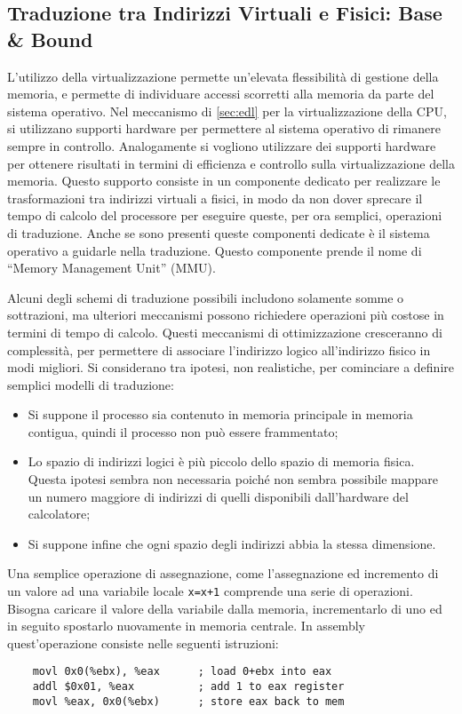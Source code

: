 \documentclass{article}
\numberwithin{equation}{subsection}
\begin{document}
\subsection{Traduzione tra Indirizzi Virtuali e Fisici: Base \& Bound}

L'utilizzo della virtualizzazione permette un'elevata flessibilità di gestione della memoria, e permette di individuare accessi scorretti alla memoria da parte del 
sistema operativo. Nel meccanismo di \ref{sec:edl} per la virtualizzazione della CPU, si utilizzano supporti hardware per permettere al sistema operativo di 
rimanere sempre in controllo. 
Analogamente si vogliono utilizzare dei supporti hardware per ottenere risultati in termini di efficienza e controllo sulla virtualizzazione della memoria. 
Questo supporto consiste in un componente dedicato per realizzare le trasformazioni tra indirizzi virtuali a fisici, in modo da non dover sprecare il tempo di calcolo 
del processore per eseguire queste, per ora semplici, operazioni di traduzione. Anche se sono presenti queste componenti dedicate è il sistema operativo a guidarle 
nella traduzione. Questo componente prende il nome di ``Memory Management Unit'' (MMU). 

Alcuni degli schemi di traduzione possibili includono solamente somme o sottrazioni, ma ulteriori meccanismi possono richiedere operazioni più costose in termini di 
tempo di calcolo. 
Questi meccanismi di ottimizzazione cresceranno di complessità, per permettere di associare l'indirizzo logico all'indirizzo fisico in modi migliori.  
Si considerano tra ipotesi, non realistiche, per cominciare a definire semplici modelli di traduzione:
\begin{itemize}
    \item Si suppone il processo sia contenuto in memoria principale in memoria contigua, quindi il processo non può essere frammentato; 
    \item Lo spazio di indirizzi logici è più piccolo dello spazio di memoria fisica. Questa ipotesi sembra non necessaria poiché non sembra possibile mappare un numero maggiore 
di indirizzi di quelli disponibili dall'hardware del calcolatore;
    \item Si suppone infine che ogni spazio degli indirizzi abbia la stessa dimensione.
\end{itemize} 

Una semplice operazione di assegnazione, come l'assegnazione ed incremento di un valore ad una variabile locale \verb|x=x+1| comprende una serie di operazioni. 
Bisogna caricare il valore della variabile dalla memoria, incrementarlo di uno ed in seguito spostarlo nuovamente in memoria centrale. In assembly quest'operazione 
consiste nelle seguenti istruzioni:
\begin{verbatim}
    movl 0x0(%ebx), %eax      ; load 0+ebx into eax
    addl $0x01, %eax          ; add 1 to eax register
    movl %eax, 0x0(%ebx)      ; store eax back to mem
\end{verbatim}
\end{document}
